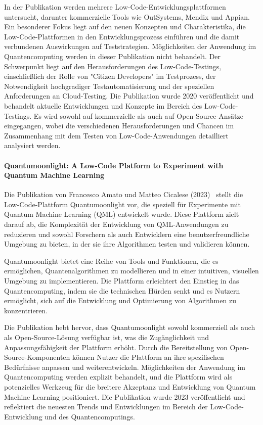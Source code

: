 In der Publikation werden mehrere Low-Code-Entwicklungsplattformen untersucht, darunter kommerzielle Tools wie OutSystems, 
Mendix und Appian. Ein besonderer Fokus liegt auf den neuen Konzepten und Charakteristika, die Low-Code-Plattformen in 
den Entwicklungsprozess einführen und die damit verbundenen Auswirkungen auf Teststrategien. Möglichkeiten der Anwendung 
im Quantencomputing werden in dieser Publikation nicht behandelt. Der Schwerpunkt liegt auf den Herausforderungen 
des Low-Code-Testings, einschließlich der Rolle von "Citizen Developers" im Testprozess, der Notwendigkeit hochgradiger 
Testautomatisierung und der speziellen Anforderungen an Cloud-Testing. Die Publikation wurde 2020 veröffentlicht und 
behandelt aktuelle Entwicklungen und Konzepte im Bereich des Low-Code-Testings. Es wird sowohl auf kommerzielle als 
auch auf Open-Source-Ansätze eingegangen, wobei die verschiedenen Herausforderungen und Chancen im Zusammenhang mit 
dem Testen von Low-Code-Anwendungen detailliert analysiert werden.

\paragraph{Quantumoonlight: A Low-Code Platform to Experiment with Quantum Machine Learning}

Die Publikation von Francesco Amato und Matteo Cicalese (2023)~\cite{Amato_2023} stellt die Low-Code-Plattform Quantumoonlight vor, 
die speziell für Experimente mit Quantum Machine Learning (QML) entwickelt wurde. Diese Plattform zielt darauf ab, 
die Komplexität der Entwicklung von QML-Anwendungen zu reduzieren und sowohl Forschern als auch Entwicklern eine 
benutzerfreundliche Umgebung zu bieten, in der sie ihre Algorithmen testen und validieren können.

Quantumoonlight bietet eine Reihe von Tools und Funktionen, die es ermöglichen, Quantenalgorithmen zu modellieren und in 
einer intuitiven, visuellen Umgebung zu implementieren. Die Plattform erleichtert den Einstieg in das Quantencomputing, 
indem sie die technischen Hürden senkt und es Nutzern ermöglicht, sich auf die Entwicklung und Optimierung von Algorithmen zu konzentrieren. 

Die Publikation hebt hervor, dass Quantumoonlight sowohl kommerziell als auch als Open-Source-Lösung verfügbar ist, 
was die Zugänglichkeit und Anpassungsfähigkeit der Plattform erhöht. Durch die Bereitstellung von Open-Source-Komponenten 
können Nutzer die Plattform an ihre spezifischen Bedürfnisse anpassen und weiterentwickeln. Möglichkeiten der 
Anwendung im Quantencomputing werden explizit behandelt, und die Plattform wird als potenzielles Werkzeug 
für die breitere Akzeptanz und Entwicklung von Quantum Machine Learning positioniert. Die Publikation wurde 2023 
veröffentlicht und reflektiert die neuesten Trends und Entwicklungen im Bereich der Low-Code-Entwicklung und des Quantencomputings.

